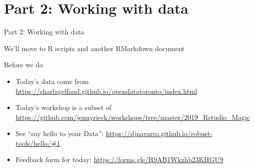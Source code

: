 \documentclass[
  ignorenonframetext,
]{beamer}
\providecommand{\tightlist}{%
  \setlength{\itemsep}{0pt}\setlength{\parskip}{0pt}}
\begin{document}
\hypertarget{part-2-working-with-data}{%
\section{Part 2: Working with data}\label{part-2-working-with-data}}

\begin{frame}{Part 2: Working with data}

We'll move to R scripts and another RMarkdown document

\end{frame}

\begin{frame}{Before we do}
\protect\hypertarget{before-we-do}{}

\begin{itemize}[<+->]
\tightlist
\item
  Today's data come from
  \url{https://sharlagelfand.github.io/opendatatoronto/index.html}
\item
  Today's workshop is a subset of
  \url{https://github.com/jennyrieck/workshops/tree/master/2019_Rstudio_Magic}
\item
  See ``say hello to your Data'':
  \url{https://djnavarro.github.io/robust-tools/hello/\#1}
\item
  Feedback form for today: \url{https://forms.gle/R9AB1Wkzhb23KHGU9}
\end{itemize}

\end{frame}
\end{document}
